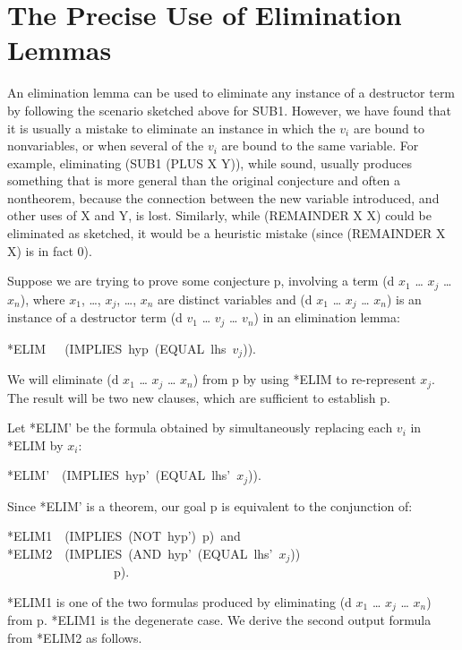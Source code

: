 \documentclass[11pt]{book}
\newenvironment{pubasis}{\begin{flushleft}\ttfamily\small}{\normalsize\rmfamily\end{flushleft}}
\newcommand{\pubdefaulttextsize}{\large}
\begin{document}
\section{The Precise Use of Elimination Lemmas}
\pubdefaulttextsize
An elimination lemma can be used to eliminate any instance of
a destructor term by following the scenario sketched above for SUB1.
However, we have found that it is usually a mistake to eliminate
an instance in which the $v_{i}$ are bound to nonvariables, or
when several of the $v_{i}$ are bound to the same variable.
For example, eliminating (SUB1 (PLUS X Y)), while sound, usually
produces something that is more general than the original conjecture
and often a nontheorem, because the connection between the new variable
introduced, and other uses of X and Y, is lost.  Similarly, while
(REMAINDER X X) could be eliminated as sketched, it would be a
heuristic mistake (since (REMAINDER X X) is in fact 0).

Suppose we are trying to prove some conjecture p,
involving a term (d $x_{1}$ \ldots{} $x_{j}$ \ldots{} $x_{n}$), where
$x_{1}$, \ldots{}, $x_{j}$, \ldots{}, $x_{n}$ are distinct variables
and (d $x_{1}$ \ldots{} $x_{j}$ \ldots{} $x_{n}$) is an instance of a
destructor term (d $v_{1}$ \ldots{} $v_{j}$ \ldots{} $v_{n}$) in
an elimination lemma:
\begin{pubasis}
*ELIM~~~(IMPLIES~hyp~(EQUAL~lhs~$v_{j}$)).\\
\end{pubasis}
We will eliminate (d $x_{1}$ \ldots{} $x_{j}$ \ldots{} $x_{n}$)
from p by using *ELIM to re-represent $x_{j}$.
The result will be two new clauses, which are
sufficient to establish p.

Let *ELIM' be the formula obtained by simultaneously
replacing each $v_{i}$ in *ELIM by $x_{i}$:
\begin{pubasis}
*ELIM'~~(IMPLIES~hyp'~(EQUAL~lhs'~$x_{j}$)).\\
\end{pubasis}
Since *ELIM' is a theorem, our goal p is equivalent
to the conjunction of:
\begin{pubasis}
*ELIM1~~(IMPLIES~(NOT~hyp')~p)~and\\

*ELIM2~~(IMPLIES~(AND~hyp'~(EQUAL~lhs'~$x_{j}$))\\
~~~~~~~~~~~~~~~~~p).\\
\end{pubasis}
*ELIM1 is one of the two formulas produced by  eliminating
(d $x_{1}$ \ldots{} $x_{j}$ \ldots{} $x_{n}$) from p.  *ELIM1 is the
degenerate case.  We derive the second output formula
from *ELIM2 as follows.
\end{document}
